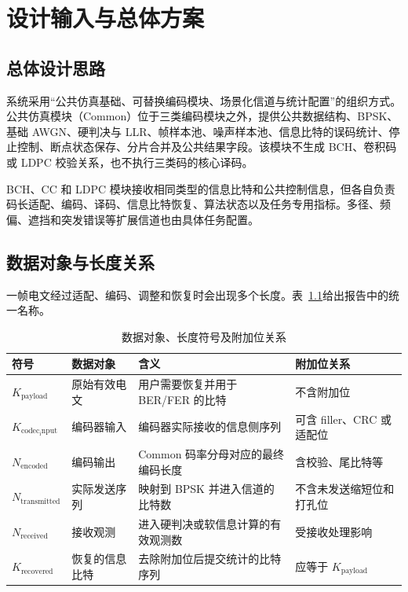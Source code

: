 \chapter{设计输入与总体方案}\label{chap:design}

\section{总体设计思路}

系统采用“公共仿真基础、可替换编码模块、场景化信道与统计配置”的组织方式。公共仿真模块（Common）位于三类编码模块之外，提供公共数据结构、BPSK、基础 AWGN、硬判决与 LLR、帧样本池、噪声样本池、信息比特的误码统计、停止控制、断点状态保存、分片合并及公共结果字段。该模块不生成 BCH、卷积码或 LDPC 校验关系，也不执行三类码的核心译码。

BCH、CC 和 LDPC 模块接收相同类型的信息比特和公共控制信息，但各自负责码长适配、编码、译码、信息比特恢复、算法状态以及任务专用指标。多径、频偏、遮挡和突发错误等扩展信道也由具体任务配置。

\section{数据对象与长度关系}

一帧电文经过适配、编码、调整和恢复时会出现多个长度。表~\ref{tab:data-length-objects}给出报告中的统一名称。

\begin{table}[htbp]
  \centering
  \small
  \caption{数据对象、长度符号及附加位关系}
  \label{tab:data-length-objects}
  \begin{tabular}{p{}p{}p{}p{}}
    \toprule
    符号 & 数据对象 & 含义 & 附加位关系 \\
    \midrule
    $K_{\mathrm{payload}}$ & 原始有效电文 & 用户需要恢复并用于 BER/FER 的比特 & 不含附加位 \\
    $K_{\mathrm{codec_input}}$ & 编码器输入 & 编码器实际接收的信息侧序列 & 可含 filler、CRC 或适配位 \\
    $N_{\mathrm{encoded}}$ & 编码输出 & Common 码率分母对应的最终编码长度 & 含校验、尾比特等 \\
    $N_{\mathrm{transmitted}}$ & 实际发送序列 & 映射到 BPSK 并进入信道的比特数 & 不含未发送缩短位和打孔位 \\
    $N_{\mathrm{received}}$ & 接收观测 & 进入硬判决或软信息计算的有效观测数 & 受接收处理影响 \\
    $K_{\mathrm{recovered}}$ & 恢复的信息比特 & 去除附加位后提交统计的比特序列 & 应等于 $K_{\mathrm{payload}}$ \\
    \bottomrule
  \end{tabular}
\end{table}

